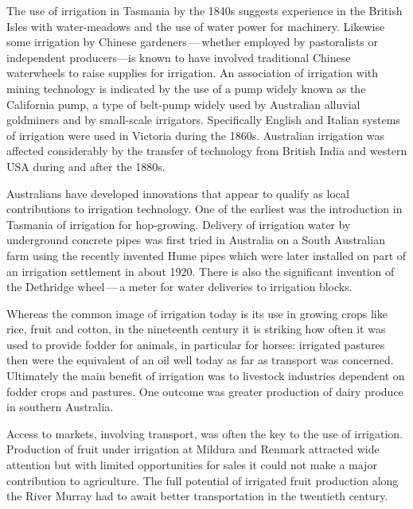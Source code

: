 The use of irrigation in Tasmania by the 1840s suggests experience in
the British Isles with water-meadows and the use of
water power for machinery.  Likewise some irrigation by Chinese
gardeners\,---\,whether employed by pastoralists or independent
producers---is known to have involved traditional
Chinese waterwheels to raise supplies for irrigation.
An association of irrigation with mining technology is indicated by
the use of a pump widely known as the California pump,
 a type of belt-pump
 widely used by Australian
alluvial goldminers and by small-scale irrigators.  Specifically
English and Italian systems of
irrigation were used in Victoria during the 1860s. Australian
irrigation was affected considerably by the transfer of technology
from British India and western USA during and after the
1880s.

Australians have developed innovations that appear to qualify as local
contributions to irrigation technology.  One of the earliest was the
introduction in Tasmania of irrigation for hop-growing.  Delivery of
irrigation water by underground concrete pipes
was first tried in Australia on a South Australian farm using the
recently invented Hume pipes which were later installed on part of an
irrigation settlement in about 1920.  There is also the significant
invention of the Dethridge wheel\,---\,a
 meter for water
deliveries to irrigation blocks.

\bigskip\noindent Whereas the common image of irrigation today is its
use in growing crops like rice, fruit and cotton, in the nineteenth
century it is striking how often it was used to provide fodder for
animals, in particular for horses: irrigated
pastures then were the equivalent of an oil well today
as far as transport was concerned. Ultimately the main benefit of
irrigation was to livestock industries dependent on
fodder crops and pastures. One outcome was greater
production of dairy produce in southern Australia.

Access to markets, involving transport, was often the key to the use
of irrigation. Production of fruit under irrigation at
Mildura  and Renmark 
attracted wide attention but with limited opportunities for sales it
could not make a major contribution to agriculture. The full potential
of irrigated fruit production along the River Murray
 had to await better transportation in the
twentieth century.


